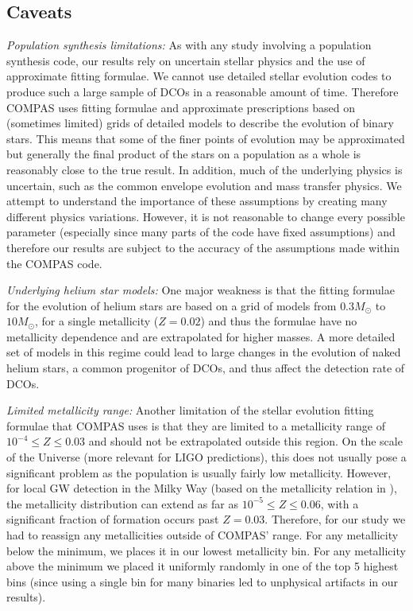 \subsection{Caveats}\label{sec:caveats}
\textit{Population synthesis limitations:} As with any study involving a population synthesis code, our results rely on uncertain stellar physics and the use of approximate fitting formulae. We cannot use detailed stellar evolution codes to produce such a large sample of DCOs in a reasonable amount of time. Therefore COMPAS uses fitting formulae and approximate prescriptions based on (sometimes limited) grids of detailed models to describe the evolution of binary stars. This means that some of the finer points of evolution may be approximated but generally the final product of the stars on a population as a whole is reasonably close to the true result. In addition, much of the underlying physics is uncertain, such as the common envelope evolution and mass transfer physics. We attempt to understand the importance of these assumptions by creating many different physics variations. However, it is not reasonable to change every possible parameter (especially since many parts of the code have fixed assumptions) and therefore our results are subject to the accuracy of the assumptions made within the COMPAS code.

\textit{Underlying helium star models:} One major weakness is that the \citet{Hurley+2000} fitting formulae for the evolution of helium stars are based on a grid of models from $0.3 \unit{M_{\odot}}$ to $10 \unit{M_{\odot}}$, for a single metallicity ($Z= 0.02$) and thus the formulae have no metallicity dependence and are extrapolated for higher masses. A more detailed set of models in this regime could lead to large changes in the evolution of naked helium stars, a common progenitor of DCOs, and thus affect the detection rate of DCOs.

\textit{Limited metallicity range:} Another limitation of the stellar evolution fitting formulae that COMPAS uses is that they are limited to a metallicity range of $10^{-4} \le Z \le 0.03$ and should not be extrapolated outside this region. On the scale of the Universe (more relevant for LIGO predictions), this does not usually pose a significant problem as the population is usually fairly low metallicity. However, for local GW detection in the Milky Way (based on the metallicity relation in \citet{Frankel+2018}), the metallicity distribution can extend as far as $10^{-5} \le Z \le 0.06$, with a significant fraction of formation occurs past $Z = 0.03$. Therefore, for our study we had to reassign any metallicities outside of COMPAS' range. For any metallicity below the minimum, we places it in our lowest metallicity bin. For any metallicity above the minimum we placed it uniformly randomly in one of the top 5 highest bins (since using a single bin for many binaries led to unphysical artifacts in our results).

